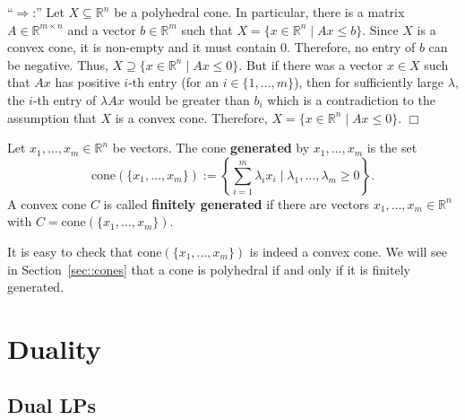 \documentclass[12pt, showidx, twoside]{article}
\def\endproof{\hfill{$\Box$}}
\def\R{\mathbb{R}}
\def\hi{\bf}
\let\oldsection\section
\def\section{\cleardoublepage\oldsection}
\begin{document}
{{{``$\Rightarrow$:'' Let $X \subseteq \R^n$ be a polyhedral cone.
In particular, there is a matrix $A\in\R^{m\times n}$ and a vector
$b \in \R^m$ such that $X = \{x \in \R^n \mid  Ax \leq b\}$.
Since $X$ is a convex cone, it is non-empty and it must contain
$0$. Therefore, no entry of $b$ can be negative. Thus,
$X \supseteq \{x \in \R^n \mid  Ax \leq 0\}$. But if there was
a vector $x \in X$ such that $Ax$ has positive $i$-th entry 
(for an $i \in \{1,\dots,m\}$), then for sufficiently large
$\lambda$, the $i$-th entry of $\lambda Ax$ would be greater than 
$b_i$ which is a contradiction to the assumption that $X$ is
a convex cone. Therefore, $X = \{x \in \R^n \mid  Ax \leq 0\}$.
\endproof


Let $x_1,\dots,x_m \in \R^n$ be vectors. The cone {\hi generated} by 
$x_1,\dots,x_m$ is the set
\[
\mbox{cone}(\{x_1,\dots,x_m\}) 
:= \left\{\sum_{i=1}^m\lambda_i x_i \mid \lambda_1,\dots,\lambda_m\geq 0\right\}.
\]
A convex cone $C$ is called {\hi finitely generated}{}
if there are 
vectors $x_1,\dots,x_m \in \R^n$ with $C = \mbox{cone}(\{x_1,\dots,x_m\})$.

It is easy to check that $\mbox{cone}(\{x_1,\dots,x_m\})$ is indeed a convex cone.
We will see in Section~\ref{sec::cones} that a cone is polyhedral if and only
if it is finitely generated.


\section{Duality}

\subsection{Dual LPs}




}}}
\end{document}
